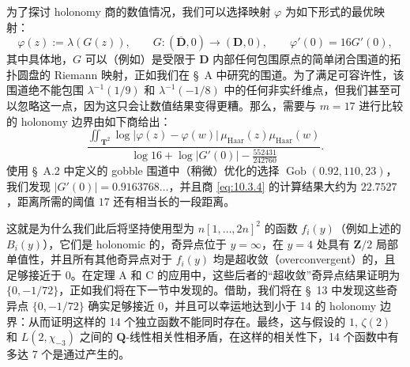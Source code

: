 \begin{remark}
为了探讨 holonomy 商的数值情况，我们可以选择映射 $\varphi$ 为如下形式的最优映射：
\[ \varphi(z) := \lambda(G(z)), \qquad G: (\overline{\mathbf{D}}, 0) \to (\mathbf{D}, 0), \qquad \varphi'(0) = 16G'(0), \]
其中具体地，$G$ 可以（例如）是受限于 $\mathbf{D}$ 内部任何包围原点的简单闭合围道的拓扑圆盘的 Riemann 映射，正如我们在 \S~A 中研究的围道。为了满足可容许性，该围道绝不能包围 $\lambda^{-1}(1/9)$ 和 $\lambda^{-1}(-1/8)$ 中的任何非实纤维点，但我们甚至可以忽略这一点，因为这只会让数值结果变得更糟。那么，需要与 $m = 17$ 进行比较的 holonomy 边界由如下商给出：
\begin{equation}\label{eq:10.3.4}\tag{10.3.4}
\frac{\iint_{\mathbf{T}^2} \log |\varphi(z) - \varphi(w)| \, \mu_{\text{Haar}}(z) \mu_{\text{Haar}}(w)}{\log 16 + \log |G'(0)| - \frac{552431}{242760}}.
\end{equation}
使用 \S~A.2 中定义的 gobble 围道中（稍微）优化的选择 $\operatorname{Gob}(0.92, 110, 23)$，我们发现 $|G'(0)| = 0.9163768\dots$，并且商 \eqref{eq:10.3.4} 的计算结果大约为 $22.7527$，距离所需的阈值 $17$ 还有相当长的一段距离。\end{remark}

\setcounter{equation}{4}
\begin{remark}[定理 A 和 C 的透视]\label{rem:10.3.5}
这就是为什么我们此后将坚持使用型为 $n[1,\dots,2n]^2$ 的函数 $f_i(y)$（例如上述的 $B_i(y)$），它们是 holonomic 的，奇异点位于 $y=\infty$，在 $y=4$ 处具有 $\mathbf{Z}/2$ 局部单值性，并且所有其他奇异点对于 $f_i(y)$ 均是超收敛（overconvergent）的，且足够接近于 0。在定理 A 和 C 的应用中，这些后者的“超收敛”奇异点结果证明为 $\{0,-1/72\}$，正如我们将在下一节中发现的。借助，我们将在 \S~13 中发现这些奇异点 $\{0,-1/72\}$ 确实足够接近 0，并且可以幸运地达到小于 14 的 holonomy 边界：从而证明这样的 14 个独立函数不能同时存在。最终，这与假设的 $1$, $\zeta(2)$ 和 $L(2, \chi_{-3})$ 之间的 $\mathbf{Q}$-线性相关性相矛盾，在这样的相关性下，14 个函数中有多达 7 个是通过产生的。
\end{remark}
